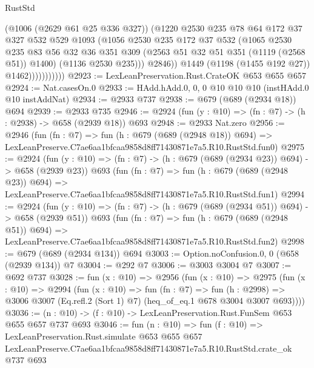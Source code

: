 \begin{lexlean}{RustStd}
\begin{coremodule}
                            (@1006 (@2629 @61 @25 @336 @327))
                            (@1220
                              @2530
                              @235
                              @78
                              @64
                              @172
                              @37
                              @327
                              @532
                              @529
                              @1093
                              (@1056
                                @2530
                                @235
                                @172
                                @37
                                @532
                                (@1065
                                  @2530
                                  @235
                                  @83
                                  @56
                                  @32
                                  @36
                                  @351
                                  @309
                                  (@2563 @51 @32 @51 @351 (@1119 (@2568 @51)) @1400)
                                  (@1136 @2530 @235)))
                              @2846))
                          @1449
                          (@1198 (@1455 @192 @27))
                          @1462)))))))))))
@2923 := LexLeanPreservation.Rust.CrateOK @653 @655 @657
@2924 := Nat.casesOn.{0}
@2933 := HAdd.hAdd.{0, 0, 0} @10 @10 @10 (instHAdd.{0} @10 instAddNat)
@2934 := @2933 @737
@2938 := @679 (@689 (@2934 @18)) @694
@2939 := @2933 @735
@2946 := @2924 (fun (y : @10) => (fn : @7) -> (h : @2938) -> @658 (@2939 @18)) @693
@2948 := @2933 Nat.zero
@2956 := @2946
    (fun (fn : @7) =>
    fun (h : @679 (@689 (@2948 @18)) @694) =>
    LexLeanPreserve.C7ae6aa1bfcaa9858d8ff71430871e7a5.R10.RustStd.fun0)
@2975 := @2924
    (fun (y : @10) => (fn : @7) -> (h : @679 (@689 (@2934 @23)) @694) -> @658 (@2939 @23))
    @693
    (fun (fn : @7) =>
    fun (h : @679 (@689 (@2948 @23)) @694) =>
    LexLeanPreserve.C7ae6aa1bfcaa9858d8ff71430871e7a5.R10.RustStd.fun1)
@2994 := @2924
    (fun (y : @10) => (fn : @7) -> (h : @679 (@689 (@2934 @51)) @694) -> @658 (@2939 @51))
    @693
    (fun (fn : @7) =>
    fun (h : @679 (@689 (@2948 @51)) @694) =>
    LexLeanPreserve.C7ae6aa1bfcaa9858d8ff71430871e7a5.R10.RustStd.fun2)
@2998 := @679 (@689 (@2934 @134)) @694
@3003 := Option.noConfusion.{0, 0} (@658 (@2939 @134)) @7
@3004 := @292 @7
@3006 := @3003 @3004 @7
@3007 := @692 @737
@3028 := fun (x : @10) =>
  @2956
    (fun (x : @10) =>
    @2975
      (fun (x : @10) =>
      @2994
        (fun (x : @10) =>
        fun (fn : @7) =>
        fun (h : @2998) =>
        @3006 @3007 (Eq.refl.{2} (Sort 1) @7) (heq_of_eq.{1} @678 @3004 @3007 @693))))
@3036 := (n : @10) -> (f : @10) -> LexLeanPreservation.Rust.FunSem @653 @655 @657 @737 @693
@3046 := fun (n : @10) =>
  fun (f : @10) =>
  LexLeanPreservation.Rust.simulate
    @653
    @655
    @657
    LexLeanPreserve.C7ae6aa1bfcaa9858d8ff71430871e7a5.R10.RustStd.crate_ok
    @737
    @693
\end{coremodule}
\end{lexlean}

